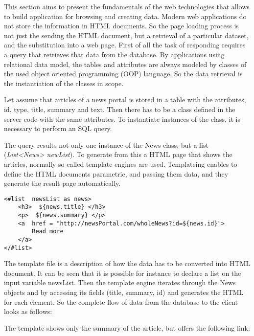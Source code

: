 This section aims to present the fundamentals of the web technologies that allows to build application for browsing and creating data. Modern web applications do not store the information in HTML documents. So the page loading process is not just the sending the HTML document, but a retrieval of a particular dataset, and the substitution into a web page. First of all the task of responding requires a query that retrieves that data from the database. By applications using relational data model, the tables and attributes are always modeled by classes of the used object oriented programming (OOP) language. So the data retrieval is the instantiation of the classes in scope. 

Let assume that articles of a news portal is stored in a table with the attributes, id, type, title, summary and text. Then there has to be a class defined in the server code with the same attributes. To instantiate instances of the class, it is necessary to perform an SQL query.



The query results not only one instance of the News class, but a list (\textit{List<News> newList}). To generate from this a HTML page that shows the articles, normally so called template engines are used. Templateing enables to define the HTML documents parametric, and passing them data, and they generate the result page automatically.   

\begin{lstlisting}[captionpos=b, caption=Template file example, label=skullJSON, belowskip=1em, aboveskip=2em,
basicstyle=\footnotesize,frame=single]
<#list  newsList as news>
	<h3>  ${news.title} </h3>
	<p>  ${news.summary} </p>
	<a  href = "http://newsPortal.com/wholeNews?id=${news.id}"> 
		Read more 
	</a>
</#list>
\end{lstlisting}

The template file is a description of how the data has to be converted into HTML document. It can be seen that it is possible for instance to declare a list on the input variable newsList. Then the template engine iterates through the News objects and by accessing its fields (title, summary, id) and generates the HTML for each element. So the complete flow of data from the database to the client looks as follows: 



The template shows only the summary of the article, but offers the following link: 

